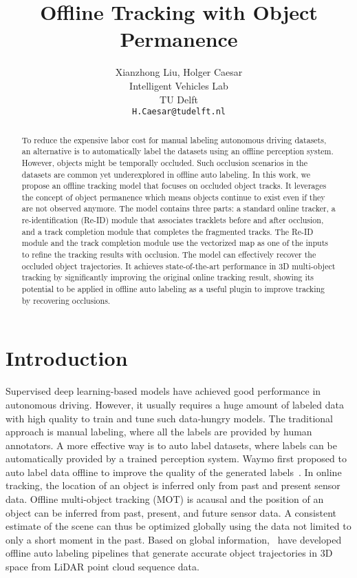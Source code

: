 \documentclass{article} \usepackage{iclr2023_conference,times}
\title{Offline Tracking with Object Permanence}
\author{Xianzhong Liu, Holger Caesar\\ Intelligent Vehicles Lab\\
TU Delft\\
\texttt{H.Caesar@tudelft.nl} \\
}
\begin{document}
\maketitle

\begin{abstract}
To reduce the expensive labor cost for manual labeling autonomous driving datasets, an alternative is to automatically label the datasets using an offline perception system. However, objects might be temporally occluded. Such occlusion scenarios in the datasets are common yet underexplored in offline auto labeling. In this work, we propose an offline tracking model that focuses on occluded object tracks. It leverages the concept of object permanence which means objects continue to exist even if they are not observed anymore. The model contains three parts: a standard online tracker, a re-identification (Re-ID) module that associates tracklets before and after occlusion, and a track completion module that completes the fragmented tracks. The Re-ID module and the track completion module use the vectorized map as one of the inputs to refine the tracking results with occlusion. The model can effectively recover the occluded object trajectories. It achieves state-of-the-art performance in 3D multi-object tracking by significantly improving the original online tracking result, showing its potential to be applied in offline auto labeling as a useful plugin to improve tracking by recovering occlusions. 
\end{abstract}

\vspace{-4mm}

\section{Introduction}
Supervised deep learning-based models have achieved good performance in autonomous driving. However, it usually requires a huge amount of labeled data with high quality to train and tune such data-hungry models. The traditional approach is manual labeling, where all the labels are provided by human annotators. A more effective way is to auto label datasets, where labels can be automatically provided by a trained perception system. Waymo first proposed to auto label data offline to improve the quality of the generated labels~\cite{offboard_labeling}. In online tracking, the location of an object is inferred only from past and present sensor data. Offline multi-object tracking (MOT) is acausal and the position of an object can be inferred from past, present, and future sensor data. A consistent estimate of the scene can thus be optimized globally using the data not limited to only a short moment in the past. Based on global information,~\cite{Auto4d,offboard_labeling, CTRL, Detzero} have developed offline auto labeling pipelines that generate accurate object trajectories in 3D space from LiDAR point cloud sequence data.
\end{document}

